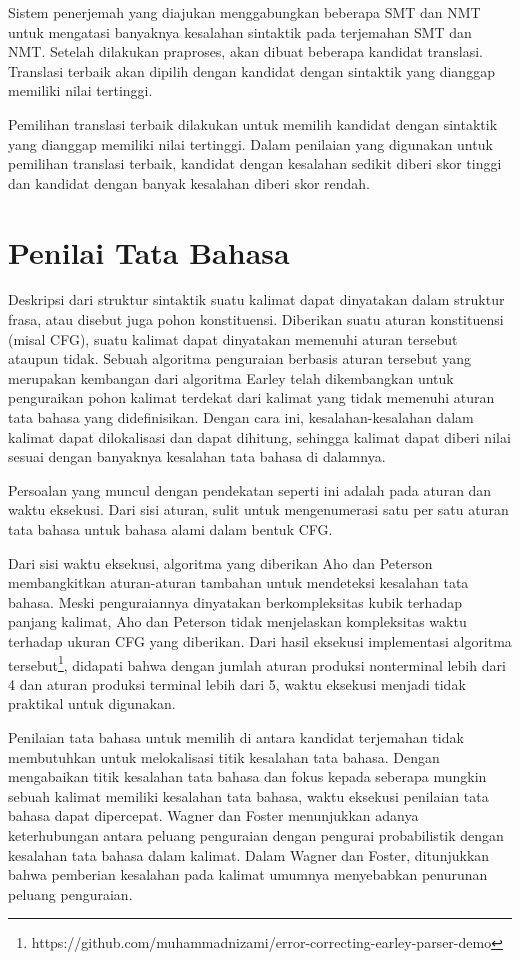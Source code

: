 \documentclass[conference]{IEEEtran}
\begin{document}
Sistem penerjemah yang diajukan menggabungkan beberapa SMT dan NMT untuk mengatasi banyaknya kesalahan sintaktik pada terjemahan SMT dan NMT. Setelah dilakukan praproses, akan dibuat beberapa kandidat translasi. Translasi terbaik akan dipilih dengan kandidat dengan sintaktik yang dianggap memiliki nilai tertinggi.

Pemilihan translasi terbaik dilakukan untuk memilih kandidat dengan sintaktik yang dianggap memiliki nilai tertinggi. Dalam penilaian yang digunakan untuk pemilihan translasi terbaik, kandidat dengan kesalahan sedikit diberi skor tinggi dan kandidat dengan banyak kesalahan diberi skor rendah.

\section{Penilai Tata Bahasa}

Deskripsi dari struktur sintaktik suatu kalimat dapat dinyatakan dalam struktur frasa, atau disebut juga pohon konstituensi. Diberikan suatu aturan konstituensi (misal CFG), suatu kalimat dapat dinyatakan memenuhi aturan tersebut ataupun tidak\cite{b1}. Sebuah algoritma penguraian berbasis aturan tersebut \cite{b2} yang merupakan kembangan dari algoritma Earley \cite{b3} telah dikembangkan untuk penguraikan pohon kalimat terdekat dari kalimat yang tidak memenuhi aturan tata bahasa yang didefinisikan. Dengan cara ini, kesalahan-kesalahan dalam kalimat dapat dilokalisasi dan dapat dihitung, sehingga kalimat dapat diberi nilai sesuai dengan banyaknya kesalahan tata bahasa di dalamnya.

Persoalan yang muncul dengan pendekatan seperti ini adalah pada aturan dan waktu eksekusi. Dari sisi aturan, sulit untuk mengenumerasi satu per satu aturan tata bahasa untuk bahasa alami dalam bentuk CFG.

Dari sisi waktu eksekusi, algoritma yang diberikan Aho dan Peterson \cite{b2} membangkitkan aturan-aturan tambahan untuk mendeteksi kesalahan tata bahasa. Meski penguraiannya dinyatakan berkompleksitas kubik terhadap panjang kalimat, Aho dan Peterson tidak menjelaskan kompleksitas waktu terhadap ukuran CFG yang diberikan. Dari hasil eksekusi implementasi algoritma tersebut\footnote{https://github.com/muhammadnizami/error-correcting-earley-parser-demo}, didapati bahwa dengan jumlah aturan produksi nonterminal lebih dari 4 dan aturan produksi terminal lebih dari 5, waktu eksekusi menjadi tidak praktikal untuk digunakan.

Penilaian tata bahasa untuk memilih di antara kandidat terjemahan tidak membutuhkan untuk melokalisasi titik kesalahan tata bahasa. Dengan mengabaikan titik kesalahan tata bahasa dan fokus kepada seberapa mungkin sebuah kalimat memiliki kesalahan tata bahasa, waktu eksekusi penilaian tata bahasa dapat dipercepat. Wagner dan Foster \cite{b4} menunjukkan adanya keterhubungan antara peluang penguraian dengan pengurai probabilistik dengan kesalahan tata bahasa dalam kalimat. Dalam Wagner dan Foster\cite{b4}, ditunjukkan bahwa pemberian kesalahan pada kalimat umumnya menyebabkan penurunan peluang penguraian.
\end{document}
